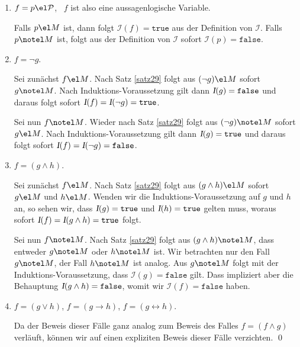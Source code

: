 \begin{enumerate}
\item $f = p \el \mathcal{P}$, \ $f$ ist also eine aussagenlogische Variable.
    
      Falls $p \el M$ ist, dann folgt $\mathcal{I}(f) = \mathtt{true}$ aus der Definition
      von $\mathcal{I}$.   Falls $p \notel M$ ist, folgt aus der Definition von
      $\mathcal{I}$ sofort $\mathcal{I}(p) = \mathtt{false}$.
      
\item $f = \neg g$.  

      Sei zunächst $f \el M$. Nach Satz \ref{satz29} folgt aus $(\neg g) \el M$ sofort
      $g \notel M$.  Nach Induktions-Voraussetzung gilt dann $\textsl{I}(g) = \mathtt{false}$ und
      daraus folgt sofort $\textsl{I}(f) = \textsl{I}(\neg g) = \mathtt{true}$.
      
      Sei nun $f \notel M$. Wieder nach Satz \ref{satz29} folgt aus $(\neg g) \notel M$ sofort
      $g \el M$.  Nach Induktions-Voraussetzung gilt dann $\textsl{I}(g) = \mathtt{true}$ und
      daraus folgt sofort $\textsl{I}(f) = \textsl{I}(\neg g) = \mathtt{false}$.
\item $f = (g \wedge h)$.

      Sei zunächst $f \el M$.  Nach Satz \ref{satz29} folgt aus $(g \wedge h) \el M$ sofort
      $g \el M$ und $h \el M$.  Wenden wir die Induktions-Voraussetzung auf $g$ und $h$ an, so sehen
      wir, dass $\textsl{I}(g) = \mathtt{true}$ und
      $\textsl{I}(h) = \mathtt{true}$ gelten muss, woraus sofort
      $\textsl{I}(f) = \textsl{I}(g \wedge h) = \mathtt{true}$ folgt.
      
      Sei nun $f \notel M$. Nach Satz \ref{satz29} folgt aus $(g \wedge h) \notel M$, dass
      entweder $g \notel M$ oder $h \notel M$ ist.  Wir betrachten nur den Fall $g \notel M$, 
      der Fall $h \notel M$ ist analog.  Aus $g \notel M$ folgt mit der Induktions-Voraussetzung,
      dass $\mathcal{I}(g) = \mathtt{false}$ gilt.  Dass impliziert aber die Behauptung 
      $\textsl{I}(g \wedge h) = \mathtt{false}$, womit wir $\mathcal{I}(f) = \mathtt{false}$ haben.
\item $f = (g \vee h)$,
      $f = (g \rightarrow h)$,
      $f = (g \leftrightarrow h)$.
      
      Da der Beweis dieser Fälle ganz analog zum Beweis des Falles $f = (f \wedge g)$ verläuft,
      können wir auf einen expliziten Beweis dieser Fälle verzichten. \qed
\end{enumerate}


